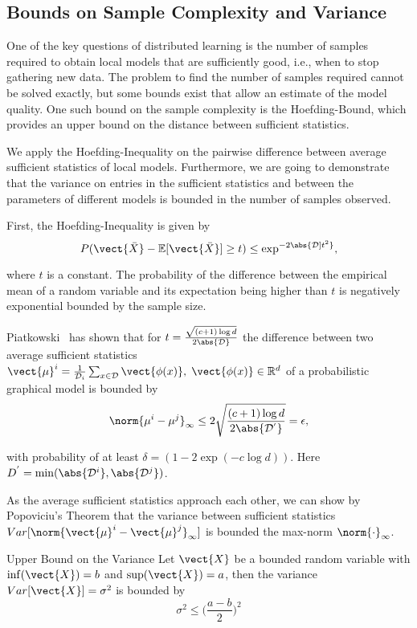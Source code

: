 \subsection{Bounds on Sample Complexity and Variance}
\label{ssec:bounds}
One of the key questions of distributed learning is the number of samples required to obtain local models that are sufficiently good, i.e., when to stop gathering new data.
The problem to find the number of samples required cannot be solved exactly, but some bounds exist that allow an estimate of the model quality.
One such bound on the sample complexity is the Hoefding-Bound, which provides an upper bound on the distance between sufficient statistics.
 
We apply the Hoefding-Inequality on the pairwise difference between average sufficient statistics of local models.
Furthermore, we are going to demonstrate that the variance on entries in the sufficient statistics and between the parameters of different models is bounded in the number of samples observed.

First, the Hoefding-Inequality is given by
\begin{equation}
    P(\vect{\bar{X}} - \mathbb{E}[\vect{\bar{X}}] \geq t ) \leq \exp^{-2\abs{\mathcal{D}]t^2}},
\end{equation}

where  $t$ is a constant. 
The probability of the difference between the empirical mean of a random variable and its expectation being higher than $t$ is negatively exponential bounded by the sample size.

Piatkowski~\cite{piatkowski2019distributed} has shown that for $t = \frac{\sqrt{(c+1) \log d}}{2\abs{\mathcal{D}}}$ the difference between two average sufficient statistics $\vect{\mu}^i = \frac{1}{\mathcal{D}_i} \sum_{x \in \mathcal{D}} \vect{\phi(x)}, \; \vect{\phi(x)} \in \mathbb{R}^d$ of a probabilistic graphical model is bounded by
\begin{equation}
    \label{eq:hoefd}
    \norm{\mu^{i} -  \mu^{j}}_\infty \leq 2 \sqrt{
        \frac{(c+1) \log d}
        {2\abs{\mathcal{D^{'}}}}
        } = \epsilon,
\end{equation}

with probability of at least $\delta= (1- 2 \exp(-c \log d))$. Here $D^{'} = \min(\abs{\mathcal{D}^i}, \abs{\mathcal{D}^j})$.

As the average sufficient statistics approach each other, we can show by Popoviciu's Theorem \cite{popoviciu1935equations} that the variance between sufficient statistics $Var[\norm{\vect{\mu}^{i} -  \vect{\mu}^{j}}_\infty]$ is bounded \wrt the max-norm $\norm{\cdot}_{\infty}$.
\begin{threm}{Upper Bound on the Variance}
    Let $\vect{X}$ be a bounded random variable with $\inf(\vect{X}) = b$ and $\sup(\vect{X}) = a$, 
    then the variance $Var[\vect{X}] = \sigma^2$ is bounded by 
    \begin{equation}
        \sigma^2 \leq \bigg(\frac{a-b}{2}\bigg)^{2}
    \end{equation}
\end{threm}

